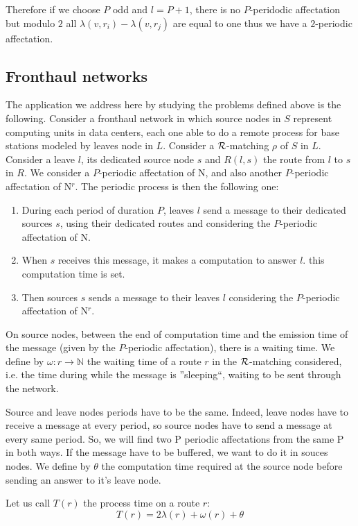 \documentclass{article}
\begin{document}
Therefore if we choose $P$ odd and $l=P+1$, there is no $P$-peridodic affectation but modulo $2$ all $\lambda(v,r_i) - \lambda(v,r_j)$
are equal to one thus we have a $2$-periodic affectation. 
 

\subsection{Fronthaul networks}

The application we address here by studying the problems defined above is the following. Consider a fronthaul network in which source nodes in $S$ represent computing units in data centers,
each one able to do a remote process for base stations modeled by leaves node in $L$. Consider a ${\cal R}$-matching $\rho$ of $S$ in $L$. Consider a leave $l$, its dedicated source node $s$
and $R(l,s)$ the route from $l$ to $s$ in $R$. We consider a $P$-periodic affectation of N, and also another $P$-periodic affectation of N$^{r}$.
The periodic process is then the following one:
\begin{enumerate}
 \item During each period of duration $P$, leaves $l$ send a message to their dedicated sources $s$, using their dedicated routes and considering the $P$-periodic affectation of N. 
 \item When $s$ receives this message, it makes a computation to answer $l$. this computation time is set.
 \item Then sources $s$ sends a message to their leaves $l$ considering the $P$-periodic affectation of N$^{r}$.
\end{enumerate}
On source nodes, between the end of computation time and the emission time of the message (given by the $P$-periodic affectation), there is a waiting time. 
We define by $\omega : r \rightarrow \mathbb{N}$ the waiting time of a route $r$ in the ${\cal R}$-matching considered, i.e. the time during while the
message is ''sleeping``, waiting to be sent through the network.


Source and leave nodes periods have to be the same. Indeed, leave nodes have to receive a message at every period, so source nodes have to send a message at every same period.
So, we will find two P periodic affectations from the same P in both ways. 
If the message have to be buffered, we want to do it in souces nodes.
We define by $\theta$ the computation time required at the source node before sending an answer to it's leave node.

Let us call $T (r)$ the process time on a route $r$: $$ T (r) = 2\lambda (r) + \omega (r) + \theta$$
\end{document}
